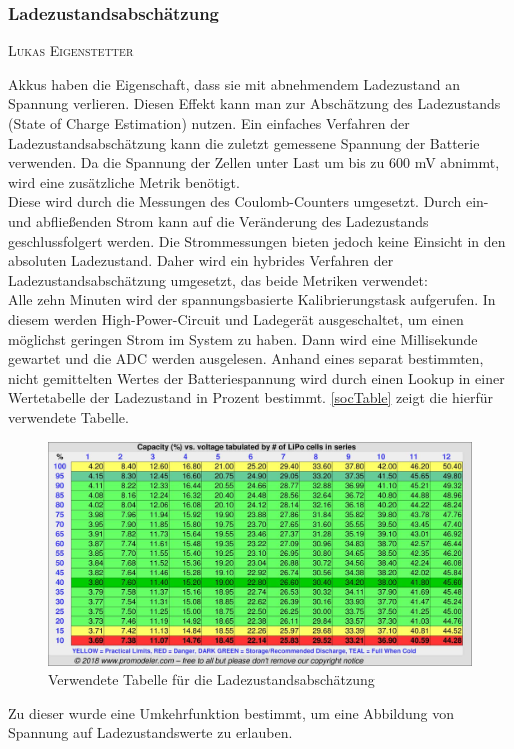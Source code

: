 \documentclass[12pt,a4paper,bibliography=totocnumbered,listof=totocnumbered]{article}
\makeatletter
\newcommand{\chapterauthor}[1]{%
  {\parindent0pt\vspace*{-5pt}%
  \linespread{1.1}\small\scshape#1%
  \par\nobreak\vspace*{3pt}}
  \@afterheading%
}
\makeatother
\begin{document}
\subsubsection{Ladezustandsabschätzung}\label{Ladezustandsabschätzung}
\chapterauthor{Lukas Eigenstetter}
Akkus haben die Eigenschaft, dass sie mit abnehmendem Ladezustand an Spannung verlieren.
Diesen Effekt kann man zur Abschätzung des Ladezustands (State of Charge Estimation) nutzen.
Ein einfaches Verfahren der Ladezustandsabschätzung kann die zuletzt gemessene Spannung der Batterie verwenden.
Da die Spannung der Zellen unter Last um bis zu 600 mV abnimmt, wird eine zusätzliche Metrik benötigt.\\
Diese wird durch die Messungen des Coulomb-Counters umgesetzt.
Durch ein- und abfließenden Strom kann auf die Veränderung des Ladezustands geschlussfolgert werden.
Die Strommessungen bieten jedoch keine Einsicht in den absoluten Ladezustand.
Daher wird ein hybrides Verfahren der Ladezustandsabschätzung umgesetzt, das beide Metriken verwendet:\\
Alle zehn Minuten wird der spannungsbasierte Kalibrierungstask aufgerufen.
In diesem werden High-Power-Circuit und Ladegerät ausgeschaltet, um einen möglichst geringen Strom im System zu haben.
Dann wird eine Millisekunde gewartet und die ADC werden ausgelesen.
Anhand eines separat bestimmten, nicht gemittelten Wertes der Batteriespannung wird durch einen Lookup in einer Wertetabelle der Ladezustand in Prozent bestimmt.
\autoref{socTable} zeigt die hierfür verwendete Tabelle.\\
\begin{figure}[htpb] %
    \centering
    \includegraphics[width=13cm,keepaspectratio=true]{pics/socTable.jpg}
    \caption{Verwendete Tabelle für die Ladezustandsabschätzung \cite{socTable}}
    \label{socTable}
\end{figure}
Zu dieser wurde eine Umkehrfunktion bestimmt, um eine Abbildung von Spannung auf Ladezustandswerte zu erlauben.
\end{document}
